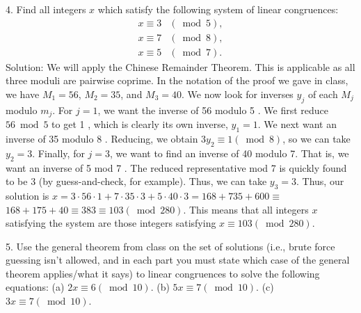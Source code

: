 \begin{enumerate}
  4. Find all integers $x$ which satisfy the following system of linear congruences:
  $$
  \begin{array}{ll}
  x \equiv 3 & (\bmod 5), \\
  x \equiv 7 & (\bmod 8), \\
  x \equiv 5 & (\bmod 7) .
  \end{array}
  $$
  Solution:
  We will apply the Chinese Remainder Theorem. This is applicable as all three moduli are pairwise coprime. In the notation of the proof we gave in class, we have $M_1=56$, $M_2=35$, and $M_3=40$. We now look for inverses $y_j$ of each $M_j$ modulo $m_j$. For $j=1$, we want the inverse of 56 modulo 5 . We first reduce $56 \bmod 5$ to get 1 , which is clearly its own inverse, $y_1=1$. We next want an inverse of 35 modulo 8 . Reducing, we obtain $3 y_2 \equiv 1(\bmod 8)$, so we can take $y_2=3$. Finally, for $j=3$, we want to find an inverse of 40 modulo 7. That is, we want an inverse of 5 mod 7 . The reduced representative mod 7 is quickly found to be 3 (by guess-and-check, for example). Thus, we can take $y_3=3$. Thus, our solution is $x=3 \cdot 56 \cdot 1+7 \cdot 35 \cdot 3+5 \cdot 40 \cdot 3=168+735+600 \equiv$ $168+175+40 \equiv 383 \equiv 103(\bmod 280)$. This means that all integers $x$ satisfying the system are those integers satisfying $x \equiv 103(\bmod 280)$.
  
  




  5. Use the general theorem from class on the set of solutions (i.e., brute force guessing isn't allowed, and in each part you must state which case of the general theorem applies/what it says) to linear congruences to solve the following equations:
  (a) $2 x \equiv 6(\bmod 10)$.
  (b) $5 x \equiv 7(\bmod 10)$.
  (c) $3 x \equiv 7(\bmod 10)$.
  

\end{enumerate}
